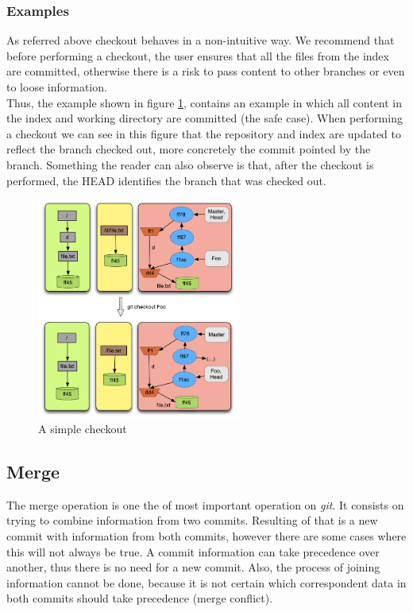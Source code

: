 \subsubsection{Examples}
As referred above checkout behaves in a non-intuitive way. We recommend that
before performing a checkout, the user ensures that all the files from
the index are committed, otherwise there is a risk to pass content to other branches or even
to loose information. \\

Thus, the example shown in figure \ref{fig:checkout}, contains an
example in which all content in the index and working directory are committed (the safe case).
When performing a checkout we can see in this figure 
that the repository and index are updated to reflect the branch checked out, more
concretely the commit pointed by the branch. Something the reader can
also observe is that, after the checkout is performed, the HEAD
identifies the branch that was checked out.\\


\begin{figure}[!t]
   \centering
   \includegraphics[width=0.6\textwidth]{images/checkout.png}
   \caption{A simple checkout}\label{fig:checkout}
\end{figure}

\subsection{Merge}

The merge operation is one the of most important operation on \emph{git}. It
consists on trying to combine information from two commits. Resulting of that
is a new commit with information from both commits, however there are some cases
where this will not always be true. A commit information can take precedence
over another, thus there is no need for a new commit. Also, the process of
joining information cannot be done, because it is not certain which
correspondent data in both commits should take precedence (merge conflict).\\

